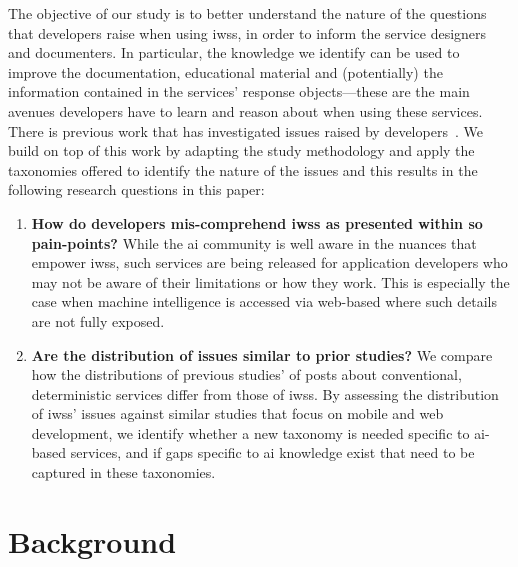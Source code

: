 The objective of our study is to better understand the nature of the questions
that developers raise when using \glspl{iws}, in order to inform the service designers and documenters. In particular, the knowledge we identify can be used to improve the documentation, educational material and (potentially) the information contained in the services' response objects---these are the main avenues developers have to learn and reason about when using these services. There is previous work that has investigated issues raised by developers~\citep{Tahir:2018ks, Beyer:2018fm, Aghajani:2019bo}. We build on top of this work by adapting the study methodology and apply the taxonomies offered to identify the nature of the issues and this results in the following research questions in this paper:

\begin{enumerate}[label=\textbf{RQ\arabic*.},leftmargin=0.1125\linewidth]
  \item \textbf{How do developers mis-comprehend \glspl{iws} as presented within \gls{so} pain-points?} While the \gls{ai} community is well aware in the nuances that empower \glspl{iws}, such services are being released for application developers who may not be aware of their limitations or how they work. This is especially the case when machine intelligence is accessed via web-based  where such details are not fully exposed.
  \item \textbf{Are the distribution of issues similar to prior studies?}
  We compare how the distributions of previous studies' of posts about conventional, deterministic  services differ from those of \glspl{iws}. By assessing the distribution of \glspl{iws}' issues against similar studies that focus on mobile and web development, we identify whether a new taxonomy is needed specific to \gls{ai}-based services, and if gaps specific to \gls{ai} knowledge exist that need to be captured in these taxonomies.
\end{enumerate}


\section{Background}
\label{icse2020:sec:related-work}

